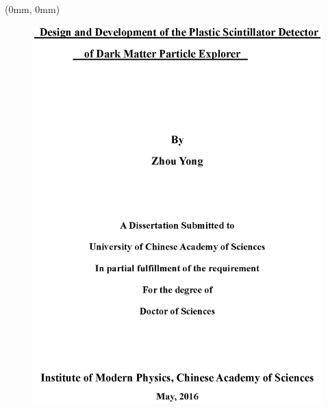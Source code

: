 \begin{textblock*}{210mm}(0mm, 0mm)
\begin{figure}[!hbt]
	\centering
	\includegraphics[width=210mm]{fig/ucas_cover_en.eps}
\end{figure}
\end{textblock*}

